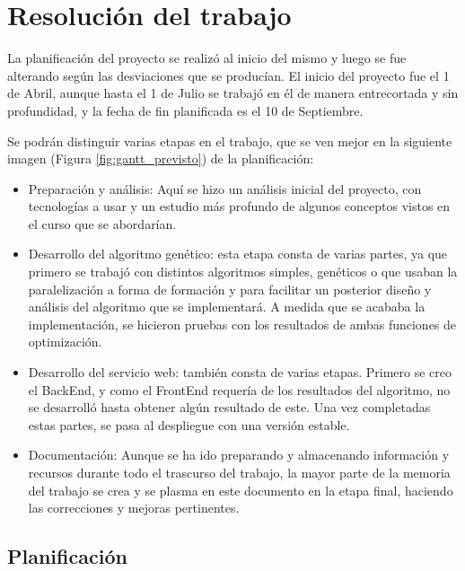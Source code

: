 \chapter{Resolución del trabajo}

\bigskip
La planificación del proyecto se realizó al inicio del mismo y luego se fue alterando según las desviaciones que se producían. El inicio del proyecto fue el 1 de Abril, aunque hasta el 1 de Julio se trabajó en él de manera entrecortada y sin profundidad, y la fecha de fin planificada es el 10 de Septiembre. 

Se podrán distinguir varias etapas en el trabajo, que se ven mejor en la siguiente imagen (Figura \ref{fig:gantt_previsto}) de la planificación:

\begin{itemize}
	\item Preparación y análisis: Aquí se hizo un análisis inicial del proyecto, con tecnologías a usar y un estudio más profundo de algunos conceptos vistos en el curso que se abordarían.
	
	\item Desarrollo del algoritmo genético: esta etapa consta de varias partes, ya que primero se trabajó con distintos algoritmos simples, genéticos o que usaban la paralelización a forma de formación y para facilitar un posterior diseño y análisis del algoritmo que se implementará. A medida que se acababa la implementación, se hicieron pruebas con los resultados de ambas funciones de optimización.
	
	\item Desarrollo del servicio web: también consta de varias etapas. Primero se creo el BackEnd, y como el FrontEnd requería de los resultados del algoritmo, no se desarrolló hasta obtener algún resultado de este. Una vez completadas estas partes, se pasa al despliegue con una versión estable.
	
	\item Documentación: Aunque se ha ido preparando y almacenando información y recursos durante todo el trascurso del trabajo, la mayor parte de la memoria del trabajo se crea y se plasma en este documento en la etapa final, haciendo las correcciones y mejoras pertinentes.
\end{itemize}
 




\newpage
\section{Planificación}

